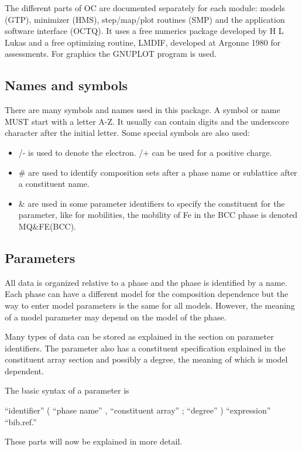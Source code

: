 \documentclass[12pt]{article}
\begin{document}
The different parts of OC are documented separately for each module:
models (GTP), minimizer (HMS), step/map/plot routines (SMP) and the
application software interface (OCTQ).  It uses a free numerics
package developed by H L Lukas and a free optimizing routine, LMDIF,
developed at Argonne 1980 for assessments.  For graphics the GNUPLOT
program is used.

\subsection{Names and symbols}

There are many symbols and names used in this package.  A symbol or
name MUST start with a letter A-Z.  It usually can contain digits and
the underscore character after the initial letter.  Some special
symbols are also used:

\begin{itemize}
\item /- is used to denote the electron. /+ can be used for a positive charge.
\item \# are used to identify composition sets after a phase name or
sublattice after a constituent name.
\item \& are used in some parameter identifiers to specify the
  constituent for the parameter, like for mobilities, the mobility
  of Fe in the BCC phase is denoted MQ\&FE(BCC).
\end{itemize}

\subsection{Parameters}

All data is organized relative to a phase and the phase is identified
by a name.  Each phase can have a different model for the composition
dependence but the way to enter model parameters is the same for all
models.  However, the meaning of a model parameter may depend on the
model of the phase.

Many types of data can be stored as explained in the section on
parameter identifiers.  The parameter also has a constituent
specification explained in the constituent array section and possibly
a degree, the meaning of which is model dependent.

The basic syntax of a parameter is

``identifier'' ( ``phase name'' , ``constituent array'' ; ``degree'' ) ``expression'' ``bib.ref.''

These parts will now be explained in more detail.
\end{document}
